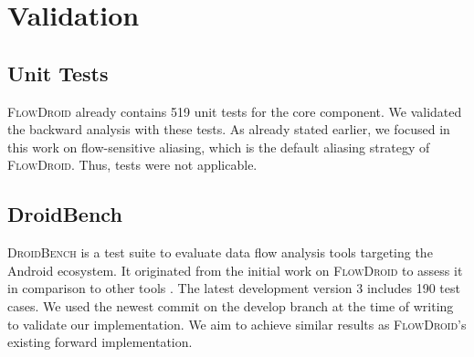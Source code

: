 \documentclass[../draft.tex]{subfiles}
\begin{document}
    \chapter{Validation}\label{c:validation}
    \section{Unit Tests}
    \textsc{FlowDroid} already contains 519 unit tests for the core component.
    We validated the backward analysis with these tests.
    As already stated earlier, we focused in this work on flow-sensitive aliasing, which is the default aliasing strategy of \textsc{FlowDroid}. Thus,  tests were not applicable.



    \section{DroidBench}\label{s:droidbenchvalidation}
    \textsc{DroidBench} is a test suite to evaluate data flow analysis tools targeting the Android ecosystem.
    It originated from the initial work on \textsc{FlowDroid} to assess it in comparison to other tools \cite{Arzt2014}.
    The latest development version 3 includes 190 test cases\footnotemark{}.
    We used the newest commit on the develop branch at the time of writing\footnotemark{} to validate our implementation.
    We aim to achieve similar results as \textsc{FlowDroid}'s existing forward implementation.
\end{document}
